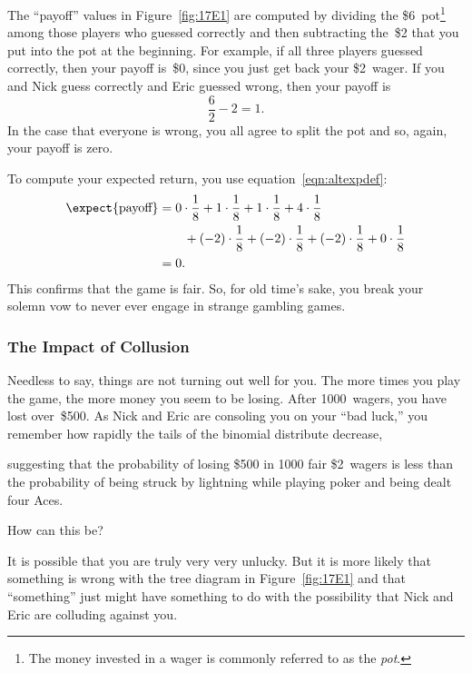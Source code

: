 The ``payoff'' values in Figure~\ref{fig:17E1} are computed by
dividing the \$6~pot\footnote{The money invested in a wager is
  commonly referred to as the \emph{pot}.} among those players who
guessed correctly and then subtracting the~\$2 that you put into the
pot at the beginning.  For example, if all three players guessed
correctly, then your payoff is~\$0, since you just get back your
\$2~wager.  If you and Nick guess correctly and Eric guessed wrong,
then your payoff is
\begin{equation*}
    \frac{6}{2} - 2 = 1.
\end{equation*}
In the case that everyone is wrong, you all agree to split the pot
and so, again, your payoff is zero.

To compute your expected return, you use
equation~\eqref{eqn:altexpdef}:
\begin{align*}
\expect{\text{payoff}}
    &= 0 \cdot \frac{1}{8} + 1 \cdot \frac{1}{8} + 1 \cdot \frac{1}{8}
        + 4 \cdot \frac{1}{8} \\
        & \qquad {}+ (-2) \cdot \frac{1}{8} + (-2) \cdot \frac{1}{8}
        + (-2) \cdot \frac{1}{8}
        + 0 \cdot \frac{1}{8} \\
    &= 0.
\end{align*}
This confirms that the game is fair.  So, for old time's sake, you
break your solemn vow to never ever engage in strange gambling games.

\subsubsection{The Impact of Collusion}

Needless to say, things are not turning out well for you.  The more
times you play the game, the more money you seem to be losing.  After
1000~wagers, you have lost over~\$500.  As Nick and Eric are consoling
you on your ``bad luck,'' you remember how rapidly the tails
of the binomial distribute decrease,
\iffalse
do a back-of-the-napkin calculation
using the bounds on the tails of the binomial distribution from
Section~\ref{binomial_distribution_section} that
\fi
suggesting that the probability of losing \$500 in 1000 fair \$2~wagers
is less than the probability of being struck by lightning while
playing poker and being dealt four Aces.
\iffalse
 Vietnamese Monk waltzing in and handing you
one of those golden disks.
\fi
How can this be?

It is possible that you are truly very very unlucky.  But it is more
likely that something is wrong with the tree diagram in
Figure~\ref{fig:17E1} and that ``something'' just might have
something to do with the possibility that Nick and Eric are colluding
against you.

